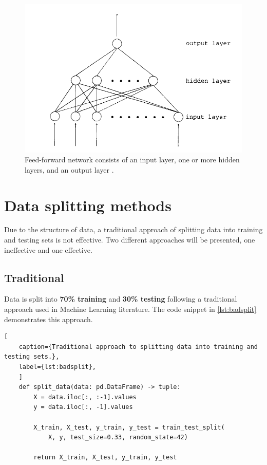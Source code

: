         \begin{figure}[H]
            \centering
            \includegraphics[width=.7\textwidth]{../src/resources/images/models/feedforward.png}
            \caption{
                Feed-forward network consists of an input layer, one or more hidden layers, and an output layer \cite{svozil_introduction_1997}.
            }
            \label{fig:multi_layer_perceptron}
        \end{figure}
    
    \newpage
        
        
    \section{Data splitting methods}
        
            Due to the structure of data, a traditional approach of splitting data into training and testing sets is not effective. Two different approaches will be presented, one ineffective and one effective.

            \subsection{Traditional} \label{sec:badsplit}
                        
                    Data is split into \textbf{70\% training} and \textbf{30\% testing} following a traditional approach used in Machine Learning literature. The code snippet in \ref{lst:badsplit} demonstrates this approach. 
            
\begin{lstlisting}[
    caption={Traditional approach to splitting data into training and testing sets.}, 
    label={lst:badsplit},
    ]            
    def split_data(data: pd.DataFrame) -> tuple:        
        X = data.iloc[:, :-1].values
        y = data.iloc[:, -1].values
        
        X_train, X_test, y_train, y_test = train_test_split(
            X, y, test_size=0.33, random_state=42)
        
        return X_train, X_test, y_train, y_test
\end{lstlisting}
                
